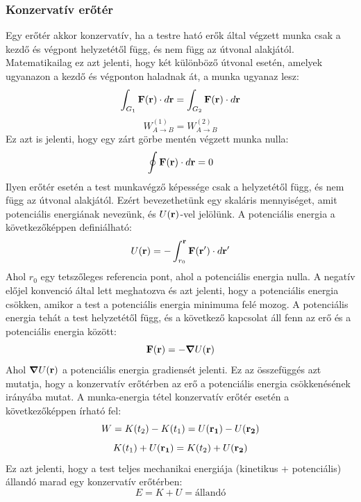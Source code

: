 \documentclass[a4paper,12pt]{article}
\begin{document}
\subsubsection{Konzervatív erőtér}
Egy erőtér akkor konzervatív, ha a testre ható erők által végzett munka csak a kezdő és végpont helyzetétől függ, és nem függ az útvonal alakjától. Matematikailag ez azt jelenti, 
hogy két különböző útvonal esetén, amelyek ugyanazon a kezdő és végponton haladnak át, a munka ugyanaz lesz:
\begin{equation}
    \int_{G_1}^{} \bold{F}(\bold{r}) \cdot d\bold{r} = \int_{G_2}^{} \bold{F}(\bold{r}) \cdot d\bold{r}
\end{equation}
\begin{equation}
    W_{A \to B}^{(1)} = W_{A \to B}^{(2)}
\end{equation}
Ez azt is jelenti, hogy egy zárt görbe mentén végzett munka nulla:
\begin{equation}
    \oint \bold{F}(\bold{r}) \cdot d\bold{r} = 0
\end{equation}
Ilyen erőtér esetén a test munkavégző képessége csak a helyzetétől függ, és nem függ az útvonal alakjától. Ezért bevezethetünk egy skaláris mennyiséget, amit potenciális energiának nevezünk, és $U(\bold{r})$-vel jelölünk. A potenciális energia a következőképpen definiálható:
\begin{equation}
    U(\bold{r}) = - \int_{r_0}^{\bold{r}} \bold{F}(\bold{r'}) \cdot d\bold{r'}
\end{equation}
Ahol $r_0$ egy tetszőleges referencia pont, ahol a potenciális energia nulla. A negatív előjel konvenció által lett meghatozva és azt jelenti, hogy a potenciális energia csökken, amikor a test a potenciális energia minimuma felé mozog.
A potenciális energia tehát a test helyzetétől függ, és a következő kapcsolat áll fenn az erő és a potenciális energia között:
\begin{equation}
    \bold{F}(\bold{r}) = - \boldsymbol{\nabla} U(\bold{r})
\end{equation}
Ahol $\boldsymbol{\nabla} U(\bold{r})$ a potenciális energia gradiensét jelenti. Ez az összefüggés azt mutatja, hogy a konzervatív erőtérben az erő a potenciális energia csökkenésének irányába mutat. A munka-energia tétel konzervatív erőtér esetén a következőképpen írható fel:
\begin{equation}
    W = K(t_2) - K(t_1) = U(\bold{r_1}) - U(\bold{r_2})
\end{equation}
\begin{equation}
    K(t_1) + U(\bold{r_1}) = K(t_2) + U(\bold{r_2})
\end{equation}
Ez azt jelenti, hogy a test teljes mechanikai energiája (kinetikus + potenciális) állandó marad egy konzervatív erőtérben:
\begin{equation}
    E = K + U = \text{állandó}
\end{equation}
\end{document}
